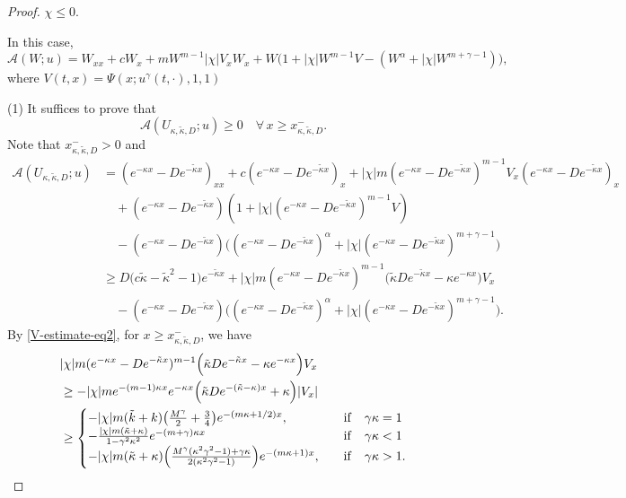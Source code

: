 \documentclass[11pt]{article} %
\theoremstyle{remark}
\theoremstyle{remark}
\numberwithin{equation}{section}
\numberwithin{figure}{section}
\numberwithin{table}{section}
\begin{document}
\begin{proof}
\smallskip

 $\chi\le 0$.

\smallskip

In this case, 
$$
\mathcal{A}(W;u)=W_{xx}+cW_x+m W^{m-1} |\chi| V_x W_x + W\big(1+|\chi|W^{m-1} V -(W^\alpha +|\chi| W^{m+\gamma-1})\big),
$$
where $V(t,x)=\Psi(x;u^\gamma (t,\cdot),1,1)$

\smallskip


(1) It suffices to prove that 
$$
\mathcal{A}(U_{\kappa,\tilde\kappa,D};u)   \ge 0\quad \forall\, x\ge x_{\kappa,\tilde\kappa,D}^-.
$$
Note that  $x_{\kappa,\tilde\kappa,D}^->0$ and 
\begin{align*}
\mathcal{A}(U_{\kappa,\tilde\kappa,D};u)   
 &= (e^{-\kappa x}-D e^{-\tilde \kappa x})_{xx}+c (e^{-\kappa x}-D e^{-\tilde\kappa x})_x+ |\chi|m ( e^{-\kappa x}-De^{-\tilde\kappa x})^{m-1} V_x (e^{-\kappa x}-D e^{-\tilde \kappa x})_x \\
&\quad +( e^{-\kappa x}-De^{-\tilde \kappa x}) (1+|\chi| ( e^{-\kappa x}-De^{-\tilde\kappa x})^{m-1}  V)\\
&\quad -(e^{-\kappa x}-De^{-\tilde\kappa x})\Big ((e^{- \kappa x}-D e^{-\tilde \kappa x})^\alpha +|\chi|  (e^{-\kappa x}-D e^{-\tilde \kappa x})^{m+\gamma -1}\Big ) \\
&\ge { D\Big(c\tilde\kappa-{\tilde\kappa^2}-1\Big) e^{-\tilde \kappa x} }+{ |\chi| m (e^{-\kappa x}-De^{-\tilde \kappa x})^{m-1} \Big(\tilde\kappa D e^{-\tilde\kappa x}-\kappa e^{-\kappa x}\Big) V_x }\\
&\quad -{ (e^{-\kappa x}-De^{-\tilde\kappa x})\Big ((e^{- \kappa x}-D e^{-\tilde \kappa x})^\alpha +|\chi|  (e^{-\kappa x}-D e^{-\tilde \kappa x})^{m+\gamma -1}\Big ) }.
\end{align*}
{By \eqref{V-estimate-eq2},  for  $x\ge x^-_{\kappa,\tilde\kappa, D}$,}  we have
\begin{align*}
&{ |\chi| m (e^{-\kappa x}-De^{-\tilde \kappa x})^{m-1} \Big(\tilde\kappa D e^{-\tilde\kappa x}-\kappa e^{-\kappa x}\Big) V_x }\\
&\ge -  |\chi| m e^{-(m-1)\kappa x} e^{-\kappa x} \Big(\tilde\kappa D e^{-(\tilde\kappa-\kappa) x}+\kappa \Big) |V_x|\\
&\ge \begin{cases}
-|\chi| m(\tilde k+k) \big(\frac{M^\gamma}{2}+\frac{3}{4}\big) e^{-(m\kappa +1/2)x},\quad &{\rm if}\quad \gamma\kappa =1\cr
-\frac{|\chi| m (\tilde \kappa+\kappa)}{1-\gamma^2 \kappa^2} e^{-(m+\gamma)\kappa x}\quad &{\rm if}\quad \gamma\kappa<1\cr
-{|\chi| m(\tilde\kappa +\kappa)\Big(\frac{M^\gamma(\kappa^2\gamma^2-1)+\gamma\kappa}{ 2(\kappa^2\gamma^2-1)}\Big)} e^{-(m\kappa +1)x},\quad &{\rm if}\quad \gamma \kappa>1.

\end{cases}
\end{align*}
\end{proof}
\end{document}
